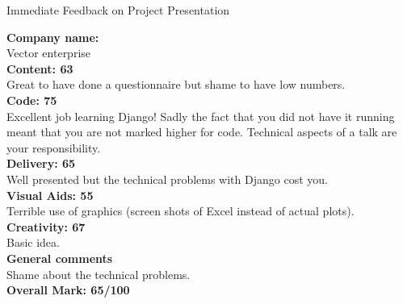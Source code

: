 \documentclass{article}
\begin{document}
\begin{center}
\Huge{Immediate Feedback on Project Presentation}\\
\end{center}


\normalsize
\textbf{Company name:}\\

Vector enterprise \\

\textbf{Content: 63}\\

Great to have done a questionnaire but shame to have low numbers.\\

\textbf{Code: 75}\\

Excellent job learning Django!
Sadly the fact that you did not have it running meant that you are not marked higher for code.
Technical aspects of a talk are your responsibility.\\

\textbf{Delivery: 65}\\

Well presented but the technical problems with Django cost you.\\

\textbf{Visual Aids: 55}\\

Terrible use of graphics (screen shots of Excel instead of actual plots).\\

\textbf{Creativity: 67}\\

Basic idea.\\

\textbf{General comments}\\

Shame about the technical problems.\\

\textbf{Overall Mark: 65/100}
\end{document}
